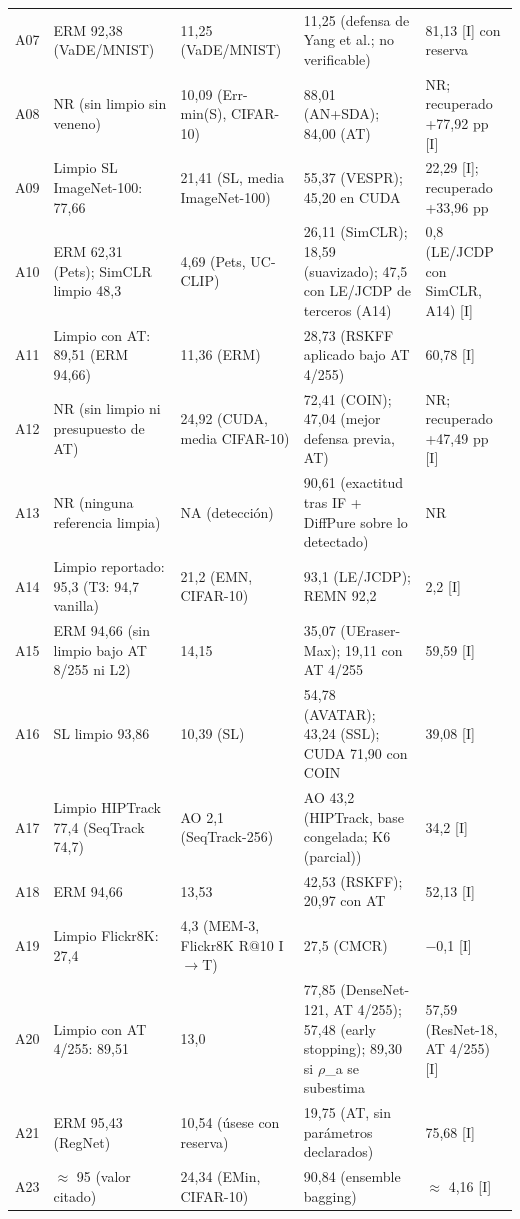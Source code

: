 \documentclass[pdflatex,sn-mathphys-num]{sn-jnl}
\theoremstyle{thmstyleone}
\theoremstyle{thmstyletwo}
\theoremstyle{thmstylethree}
\begin{document}
\begin{appendices}
\begin{longtable}{@{}L{0.95cm}L{2.7cm}L{2.2cm}L{3.5cm}L{2.2cm}@{}}
A07 & ERM\textdagger{} 92,38 (VaDE/MNIST) & 11,25 (VaDE/MNIST) & 11,25 (defensa de Yang et al.; no verificable) & 81,13\textdagger{} [I] con reserva \\
A08 & NR (sin limpio sin veneno) & 10,09 (Err-min(S), CIFAR-10) & 88,01 (AN+SDA); 84,00 (AT) & NR; recuperado +77,92 pp [I] \\
A09 & Limpio SL ImageNet-100: 77,66 & 21,41 (SL, media ImageNet-100) & 55,37 (VESPR); 45,20 en CUDA & 22,29 [I]; recuperado +33,96 pp \\
A10 & ERM\textdagger{} 62,31 (Pets); SimCLR limpio 48,3 & 4,69 (Pets, UC-CLIP) & 26,11 (SimCLR); 18,59 (suavizado); 47,5 con LE/JCDP de terceros (A14) & 0,8 (LE/JCDP con SimCLR, A14) [I] \\
A11 & Limpio con AT: 89,51 (ERM 94,66) & 11,36 (ERM) & 28,73 (RSKFF aplicado bajo AT 4/255) & 60,78 [I] \\
A12 & NR (sin limpio ni presupuesto de AT) & 24,92 (CUDA, media CIFAR-10) & 72,41 (COIN); 47,04 (mejor defensa previa, AT) & NR; recuperado +47,49 pp [I] \\
A13 & NR (ninguna referencia limpia) & NA (detección) & 90,61 (exactitud tras IF + DiffPure sobre lo detectado) & NR \\
A14 & Limpio reportado: 95,3 (T3: 94,7 vanilla) & 21,2 (EMN, CIFAR-10) & 93,1 (LE/JCDP); REMN 92,2 & 2,2 [I] \\
A15 & ERM\textdagger{} 94,66 (sin limpio bajo AT 8/255 ni L2) & 14,15 & 35,07 (UEraser-Max); 19,11 con AT 4/255 & 59,59\textdagger{} [I] \\
A16 & SL limpio 93,86 & 10,39 (SL) & 54,78 (AVATAR); 43,24 (SSL); CUDA 71,90 con COIN & 39,08\textdagger{} [I] \\
A17 & Limpio HIPTrack 77,4 (SeqTrack 74,7) & AO 2,1 (SeqTrack-256) & AO 43,2 (HIPTrack, base congelada; K6 (parcial)) & 34,2 [I] \\
A18 & ERM\textdagger{} 94,66 & 13,53 & 42,53 (RSKFF); 20,97 con AT & 52,13\textdagger{} [I] \\
A19 & Limpio Flickr8K: 27,4 & 4,3 (MEM-3, Flickr8K R@10 I$\rightarrow$T) & 27,5 (CMCR) & $-$0,1 [I] \\
A20 & Limpio con AT 4/255: 89,51 & 13,0 & 77,85 (DenseNet-121, AT 4/255); 57,48 (early stopping); 89,30 si $\rho$\_a se subestima & 57,59 (ResNet-18, AT 4/255) [I] \\
A21 & ERM\textdagger{} 95,43 (RegNet) & 10,54 (úsese con reserva) & 19,75 (AT, sin parámetros declarados) & 75,68\textdagger{} [I] \\
A23 & $\approx$ 95 (valor citado) & 24,34 (EMin, CIFAR-10) & 90,84 (ensemble bagging) & $\approx$ 4,16\textdagger{} [I] \\

\end{longtable}
\end{appendices}
\end{document}
